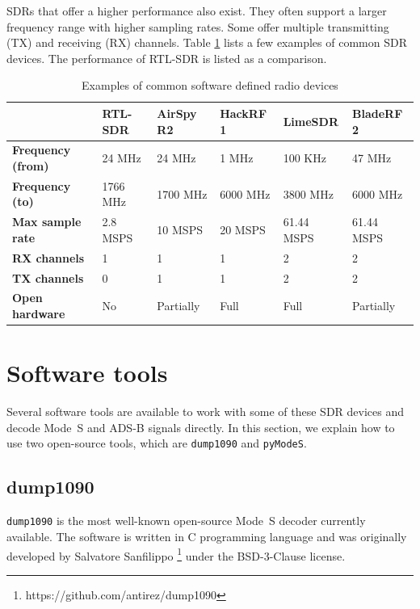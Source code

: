 SDRs that offer a higher performance also exist. They often support a larger frequency range with higher sampling rates. Some offer multiple transmitting (TX) and receiving (RX) channels. Table \ref{tb:sdr} lists a few examples of common SDR devices. The performance of RTL-SDR is listed as a comparison.

\begin{table}[ht]
  \footnotesize
  \caption{Examples of common software defined radio devices}
  \label{tb:sdr}
  \begin{tabular}{|l|l|l|l|l|l|}
  \hline
   & \textbf{RTL-SDR} & \textbf{AirSpy R2} & \textbf{HackRF 1} & \textbf{LimeSDR} & \textbf{BladeRF 2} \\ \hline
  \textbf{Frequency (from)} & 24 MHz & 24 MHz & 1 MHz & 100 KHz & 47 MHz \\ \hline
  \textbf{Frequency (to)} & 1766 MHz & 1700 MHz & 6000 MHz & 3800 MHz & 6000 MHz \\ \hline
  \textbf{Max sample rate} & 2.8 MSPS & 10 MSPS & 20 MSPS & 61.44 MSPS & 61.44 MSPS \\ \hline
  \textbf{RX channels} & 1 & 1 & 1 & 2 & 2 \\ \hline
  \textbf{TX channels} & 0 & 1 & 1 & 2 & 2 \\ \hline
  \textbf{Open hardware} & No & Partially & Full & Full & Partially \\ \hline
  \end{tabular}
\end{table}

\section{Software tools}

Several software tools are available to work with some of these SDR devices and decode Mode~S and ADS-B signals directly. In this section, we explain how to use two open-source tools, which are \texttt{dump1090} and \texttt{pyModeS}.

\subsection{dump1090}

\texttt{dump1090} is the most well-known open-source Mode~S decoder currently available. The software is written in C programming language and was originally developed by Salvatore Sanfilippo \footnote{https://github.com/antirez/dump1090} under the BSD-3-Clause license.

